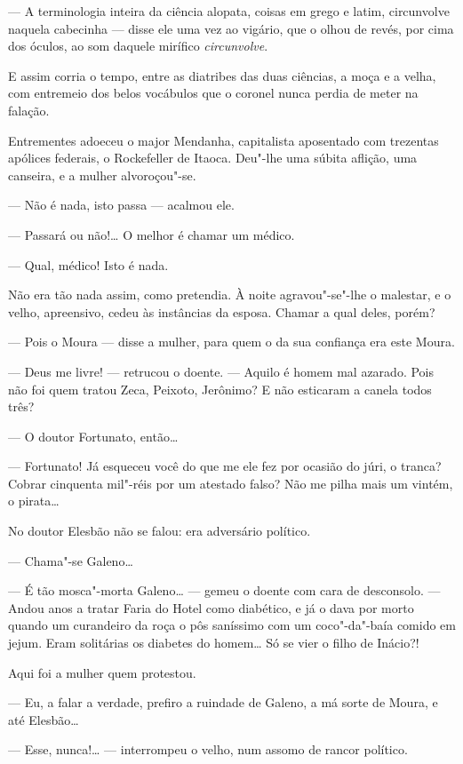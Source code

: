 --- A terminologia inteira da ciência alopata, coisas em grego e latim,
circunvolve naquela cabecinha --- disse ele uma vez ao vigário, que o
olhou de revés, por cima dos óculos, ao som daquele mirífico
\emph{circunvolve}.

E assim corria o tempo, entre as diatribes das duas ciências, a moça e a
velha, com entremeio dos belos vocábulos que o coronel nunca perdia de
meter na falação.

Entrementes adoeceu o major Mendanha, capitalista aposentado com
trezentas apólices federais, o Rockefeller de Itaoca. Deu"-lhe uma súbita
aflição, uma canseira, e a mulher alvoroçou"-se.

--- Não é nada, isto passa --- acalmou ele.

--- Passará ou não!\ldots{} O melhor é chamar um médico.

--- Qual, médico! Isto é nada.

Não era tão nada assim, como pretendia. À noite agravou"-se"-lhe o
malestar, e o velho, apreensivo, cedeu às instâncias da esposa. Chamar a
qual deles, porém?

--- Pois o Moura --- disse a mulher, para quem o da sua confiança era
este Moura.

--- Deus me livre! --- retrucou o doente. --- Aquilo é homem mal
azarado. Pois não foi quem tratou Zeca, Peixoto, Jerônimo? E não
esticaram a canela todos três?

--- O doutor Fortunato, então\ldots{}

--- Fortunato! Já esqueceu você do que me ele fez por ocasião do júri, o
tranca? Cobrar cinquenta mil"-réis por um atestado falso? Não me pilha
mais um vintém, o pirata\ldots{}

No doutor Elesbão não se falou: era adversário político.

--- Chama"-se Galeno\ldots{}

--- É tão mosca"-morta Galeno\ldots{} --- gemeu o doente com cara de
desconsolo. --- Andou anos a tratar Faria do Hotel como diabético, e já
o dava por morto quando um curandeiro da roça o pôs saníssimo com um
coco"-da"-baía comido em jejum. Eram solitárias os diabetes do homem\ldots{} Só
se vier o filho de Inácio?!

Aqui foi a mulher quem protestou.

--- Eu, a falar a verdade, prefiro a ruindade de Galeno, a má sorte de
Moura, e até Elesbão\ldots{}

--- Esse, nunca!\ldots{} --- interrompeu o velho, num assomo de rancor
político.

